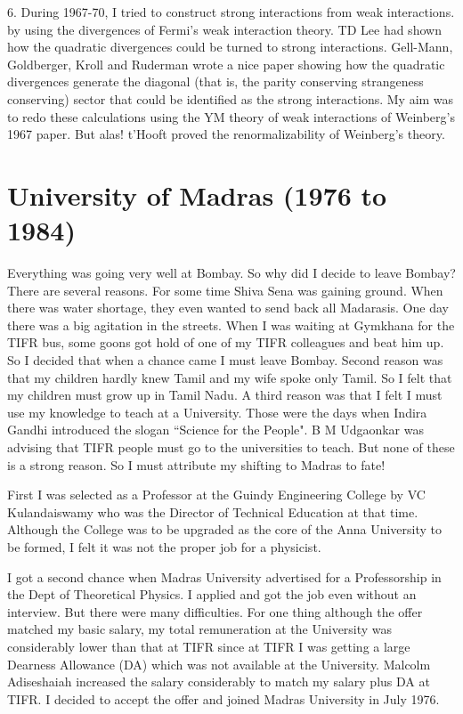 6. During 1967-70, I tried to construct strong interactions from weak 
interactions. by using the divergences of Fermi's weak interaction 
theory. TD Lee had shown how the quadratic divergences could be turned 
to strong interactions. Gell-Mann, Goldberger, Kroll and Ruderman wrote 
a nice paper showing how the quadratic divergences generate the diagonal 
(that is, the parity conserving strangeness conserving) sector that 
could be identified as the strong interactions. My aim was to redo these 
calculations using the YM theory of weak interactions of Weinberg's 1967 
paper. But alas! t'Hooft proved the renormalizability of Weinberg's 
theory.

\section*{University of Madras (1976 to 1984)}

Everything was going very well at Bombay. So why did I decide to leave 
Bombay? There are several reasons. For some time Shiva Sena was gaining 
ground. When there was water shortage, they even wanted to send back all 
Madarasis. One day there was a big agitation in the streets. When I was 
waiting at Gymkhana for the TIFR bus, some goons got hold of one of my 
TIFR colleagues and beat him up. So I decided that when a chance came I 
must leave Bombay. Second reason was that my children hardly knew Tamil 
and my wife spoke only Tamil. So I felt that my children must grow up in 
Tamil Nadu. A third reason was that I felt I must use my knowledge to 
teach at a University. Those were the days when Indira Gandhi introduced 
the slogan ``Science for the People". B M Udgaonkar was advising that 
TIFR people must go to the universities to teach. But none of these is a 
strong reason. So I must attribute my shifting to Madras to fate!

First I was selected as a Professor at the Guindy Engineering College by 
VC Kulandaiswamy who was the Director of Technical Education at that 
time. Although the College was to be upgraded as the core of the Anna 
University to be formed, I felt it was not the proper job for a 
physicist.

I got a second chance when Madras University advertised for a 
Professorship in the Dept of Theoretical Physics. I applied and got the 
job even without an interview. But there were many difficulties. For one 
thing although the offer matched my basic salary, my total remuneration 
at the University was considerably lower than that at TIFR since at TIFR 
I was getting a large Dearness Allowance (DA) which was not available at 
the University. Malcolm Adiseshaiah increased the salary considerably to 
match my salary plus DA at TIFR. I decided to accept the offer and 
joined Madras University in July 1976.

